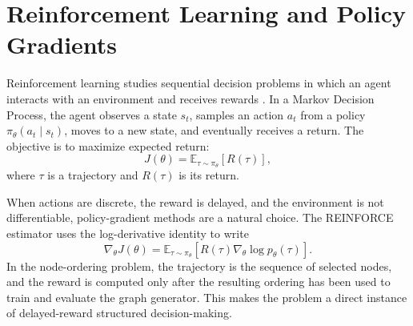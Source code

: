 \section{Reinforcement Learning and Policy Gradients}
\label{sec:rl-foundations}

Reinforcement learning studies sequential decision problems in which an agent interacts with an environment and receives rewards \cite{sutton2018reinforcement}. In a Markov Decision Process, the agent observes a state $s_t$, samples an action $a_t$ from a policy $\pi_\theta(a_t\mid s_t)$, moves to a new state, and eventually receives a return. The objective is to maximize expected return:
\begin{equation}
    J(\theta)=\mathbb{E}_{\tau\sim\pi_\theta}[R(\tau)],
\end{equation}
where $\tau$ is a trajectory and $R(\tau)$ is its return.

When actions are discrete, the reward is delayed, and the environment is not differentiable, policy-gradient methods are a natural choice. The REINFORCE estimator \cite{williams1992reinforce} uses the log-derivative identity to write
\begin{equation}
    \nabla_\theta J(\theta)
    =\mathbb{E}_{\tau\sim\pi_\theta}\left[R(\tau)\nabla_\theta\log p_\theta(\tau)\right].
\end{equation}
In the node-ordering problem, the trajectory is the sequence of selected nodes, and the reward is computed only after the resulting ordering has been used to train and evaluate the graph generator. This makes the problem a direct instance of delayed-reward structured decision-making.



